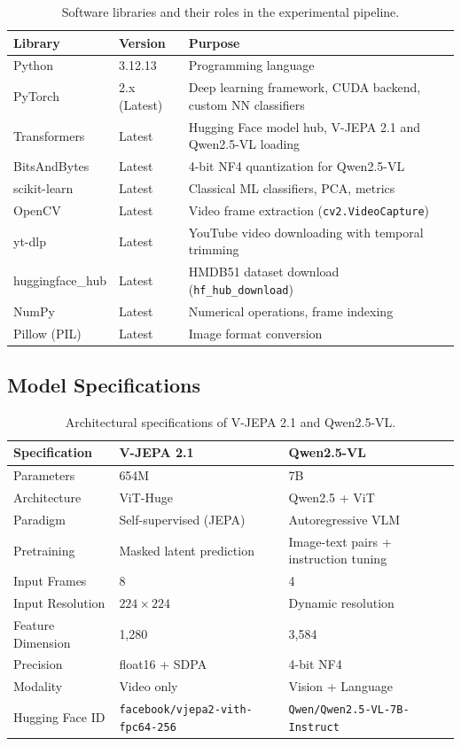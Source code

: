 \begin{table}[H]
\centering
\caption{Software libraries and their roles in the experimental pipeline.}
\label{tab:software_stack}
\begin{tabularx}{\textwidth}{l l X}
\toprule
\textbf{Library} & \textbf{Version} & \textbf{Purpose} \\
\midrule
Python & 3.12.13 & Programming language \\
PyTorch & 2.x (Latest) & Deep learning framework, CUDA backend, custom NN classifiers \\
Transformers & Latest & Hugging Face model hub, V-JEPA 2.1 and Qwen2.5-VL loading \\
BitsAndBytes & Latest & 4-bit NF4 quantization for Qwen2.5-VL \\
scikit-learn & Latest & Classical ML classifiers, PCA, metrics \\
OpenCV & Latest & Video frame extraction (\texttt{cv2.VideoCapture}) \\
yt-dlp & Latest & YouTube video downloading with temporal trimming \\
huggingface\_hub & Latest & HMDB51 dataset download (\texttt{hf\_hub\_download}) \\
NumPy & Latest & Numerical operations, frame indexing \\
Pillow (PIL) & Latest & Image format conversion \\
\bottomrule
\end{tabularx}
\end{table}

\subsection{Model Specifications}

\begin{table}[H]
\centering
\caption{Architectural specifications of V-JEPA 2.1 and Qwen2.5-VL.}
\label{tab:model_specs}
\begin{tabularx}{\textwidth}{l X X}
\toprule
\textbf{Specification} & \textbf{V-JEPA 2.1} & \textbf{Qwen2.5-VL} \\
\midrule
Parameters & 654M & 7B \\
Architecture & ViT-Huge & Qwen2.5 + ViT \\
Paradigm & Self-supervised (JEPA) & Autoregressive VLM \\
Pretraining & Masked latent prediction & Image-text pairs + instruction tuning \\
Input Frames & 8 & 4 \\
Input Resolution & $224 \times 224$ & Dynamic resolution \\
Feature Dimension & 1,280 & 3,584 \\
Precision & float16 + SDPA & 4-bit NF4 \\
Modality & Video only & Vision + Language \\
Hugging Face ID & \nolinkurl{facebook/vjepa2-vith-fpc64-256} & \nolinkurl{Qwen/Qwen2.5-VL-7B-Instruct} \\
\bottomrule
\end{tabularx}
\end{table}

